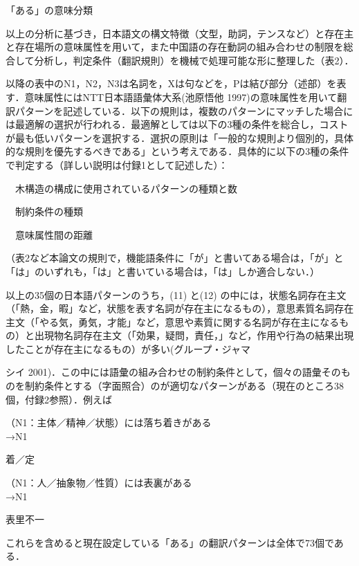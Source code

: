 \documentclass[japanese]{jnlp_1.4}
\newcommand{\inHRei}[1]{}
\begin{document}
\begin{table}[t]
\caption{「ある」の意味分類}

\end{table}


以上の分析に基づき，日本語文の構文特徴（文型，助詞，テンスなど）と存在主と存在場所の意味属性を用いて，また中国語の存在動詞の組み合わせの制限を総合して分析し，判定条件（翻訳規則）を機械で処理可能な形に整理した（表2）．


以降の表中のN1，N2，N3は名詞を，Xは句などを，Pは結び部分（述部）を表す．意味属性にはNTT日本語語彙体大系(池原悟他 1997)の意味属性を用いて翻訳パターンを記述している．以下の規則は，複数のパターンにマッチした場合には最適解の選択が行われる．最適解としては以下の3種の条件を総合し，コストが最も低いパターンを選択する．選択の原則は「一般的な規則より個別的，具体的な規則を優先するべきである」という考えである．具体的に以下の3種の条件で判定する（詳しい説明は付録1として記述した）：

　木構造の構成に使用されているパターンの種類と数

　制約条件の種類

　意味属性間の距離


（表2など本論文の規則で，機能語条件に「が」と書いてある場合は，「が」と「は」のいずれも，「は」と書いている場合は，「は」しか適合しない．）

以上の35個の日本語パターンのうち，(11) と(12) の中には，状態名詞存在主文（「熱，金，暇」など，状態を表す名詞が存在主になるもの），意思素質名詞存在主文（「やる気，勇気，才能」など，意思や素質に関する名詞が存在主になるもの）と出現物名詞存在主文（「効果，疑問，責任，」など，作用や行為の結果出現したことが存在主になるもの）が多い(グループ・ジャマ\par


\noindent
シイ 2001)．この中には語彙の組み合わせの制約条件として，個々の語彙そのものを制約条件とする（字面照合）のが適切なパターンがある（現在のところ38個，付録2参照）．例えば

\inHRei{(1)}
（N1：主体／精神／状態）には落ち着きがある\\
→N1　\begin{簡体中文}着／定\end{簡体中文}

\inHRei{(2)}
（N1：人／抽象物／性質）には表裏がある\\
→N1　\begin{簡体中文}表里不一\end{簡体中文}

これらを含めると現在設定している「ある」の翻訳パターンは全体で73個である．
\end{document}
